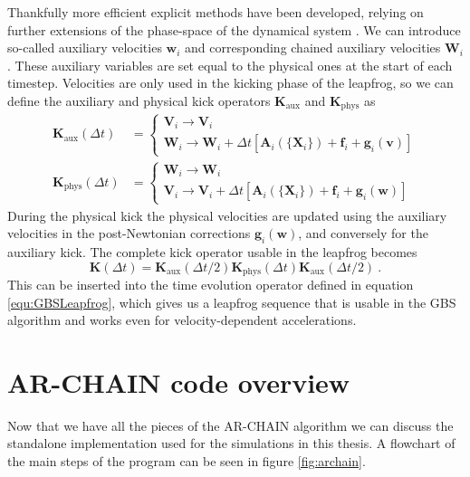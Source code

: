 \documentclass[english, oneside]{HYgradu}
\begin{document}
Thankfully more efficient explicit methods have been developed, relying on further extensions of the phase-space of the dynamical system \citep{hellstrom:2010, pihajoki:2015}. We can introduce so-called auxiliary velocities $\mathbf{w}_i$ and corresponding chained auxiliary velocities $\mathbf{W}_i$. These auxiliary variables are set equal to the physical ones at the start of each timestep. Velocities are only used in the kicking phase of the leapfrog, so we can define the auxiliary and physical kick operators $\mathbf{K}_{\mathrm{aux}}$ and $\mathbf{K}_{\mathrm{phys}}$ as
\begin{align}
\mathbf{K}_{\mathrm{aux}}(\Delta t) &=
\begin{cases}
\mathbf{V}_i \rightarrow \mathbf{V}_i \\
\mathbf{W}_i \rightarrow \mathbf{W}_i + \Delta t [ \boldsymbol{A}_i(\{ \boldsymbol{X}_i \}) + \boldsymbol{f}_i + \boldsymbol{g}_i(\mathbf{v})]
\end{cases} \\
\mathbf{K}_{\mathrm{phys}}(\Delta t) &=
\begin{cases}
\mathbf{W}_i \rightarrow \mathbf{W}_i \\
\mathbf{V}_i \rightarrow \mathbf{V}_i + \Delta t [ \boldsymbol{A}_i(\{ \boldsymbol{X}_i \}) + \boldsymbol{f}_i + \boldsymbol{g}_i(\mathbf{w})]
\end{cases}
\end{align}
During the physical kick the physical velocities are updated using the auxiliary velocities in the post-Newtonian corrections $\boldsymbol{g}_i(\mathbf{w})$, and conversely for the auxiliary kick. The complete kick operator usable in the leapfrog becomes
\begin{equation}
\mathbf{K}(\Delta t) = \mathbf{K}_{\mathrm{aux}}(\Delta t/2) \mathbf{K}_{\mathrm{phys}}(\Delta t) \mathbf{K}_{\mathrm{aux}}(\Delta t/2) \ .
\end{equation}
This can be inserted into the time evolution operator defined in equation \eqref{equ:GBSLeapfrog}, which gives us a leapfrog sequence that is usable in the GBS algorithm and works even for velocity-dependent accelerations.

\section{AR-CHAIN code overview}

Now that we have all the pieces of the AR-CHAIN algorithm we can discuss the standalone implementation used for the simulations in this thesis. A flowchart of the main steps of the program can be seen in figure \ref{fig:archain}.
\end{document}

